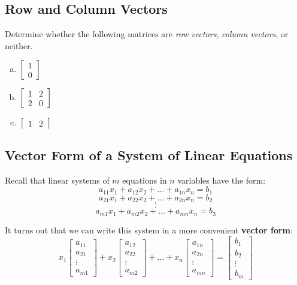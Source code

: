 \documentclass[11pt]{exam}
\begin{document}
    \subsection{Row and Column Vectors}
    \begin{questions}
        \item Determine whether the following matrices are \textit{row vectors}, \textit{column vectors}, or neither.
        \begin{enumerate}[a.]
            \item $\begin{bmatrix} 1 \\ 0 \end{bmatrix}$
            \item $\begin{bmatrix} 1 & 2 \\ 2 & 0 \end{bmatrix}$
            \item $\begin{bmatrix} 1 & 2 \end{bmatrix}$
        \end{enumerate}
    \end{questions}

    \vspace{20px}
    \subsection{Vector Form of a System of Linear Equations}
        Recall that linear systems of $m$ equations in $n$ variables have the form:
        $$a_{11}x_1 + a_{12}x_2 + \dots + a_{1n}x_n = b_1$$
        $$a_{21}x_1 + a_{22}x_2 + \dots + a_{2n}x_n = b_2$$
        $$\vdots$$
        $$a_{m1}x_1 + a_{m2}x_2 + \dots + a_{mn}x_n = b_3$$

        It turns out that we can write this system in a more convenient \textbf{vector form}:
        $$x_1 \begin{bmatrix} a_{11} \\ a_{21} \\ \vdots \\ a_{m1} \end{bmatrix} +
          x_2 \begin{bmatrix} a_{12} \\ a_{22} \\ \vdots \\ a_{m2} \end{bmatrix} +
          \dots +
          x_n \begin{bmatrix} a_{1n} \\ a_{2n} \\ \vdots \\ a_{mn} \end{bmatrix} =
          \begin{bmatrix} b_1 \\ b_2 \\ \vdots \\ b_m \end{bmatrix}
          $$
\end{document}
